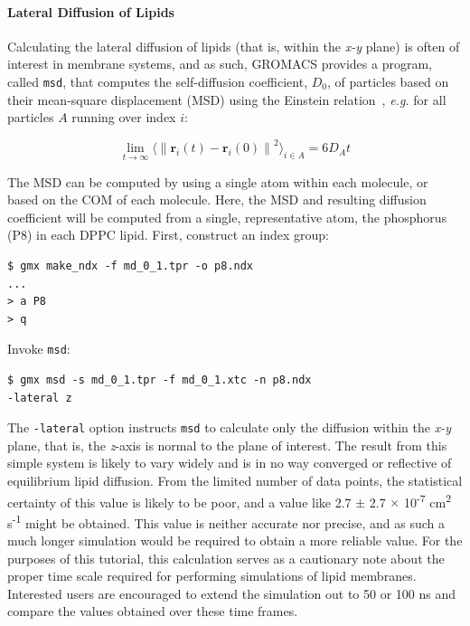 \documentclass[9pt,tutorial]{livecoms}
\newcommand{\norm}[1]{\left\lVert#1\right\rVert}
\begin{document}
\paragraph{Lateral Diffusion of Lipids} \label{kalp_ana_msd}

Calculating the lateral diffusion of lipids (that is, within the {\em x-y} plane) is often of interest in membrane systems, and as such, GROMACS provides a program, called \texttt{msd}, that computes the self-diffusion coefficient, $D_0$, of particles based on their mean-square displacement (MSD) using the Einstein relation~\cite{Allen1987}, {\em e.g.} for all particles $A$ running over index $i$: 

\begin{equation} \label{eq_msd}
\lim_{t\to\infty} \langle \norm{\mathbf{r}_i(t) - \mathbf{r}_i(0)}^2 \rangle_{i \in A} = 6D_{A}t
\end{equation}

The MSD can be computed by using a single atom within each molecule, or based on the COM of each molecule. Here, the MSD and resulting diffusion coefficient will be computed from a single, representative atom, the phosphorus (P8) in each DPPC lipid. First, construct an index group:

\begin{verbatim}
$ gmx make_ndx -f md_0_1.tpr -o p8.ndx
...
> a P8
> q
\end{verbatim}

Invoke \texttt{msd}:

\begin{verbatim}
$ gmx msd -s md_0_1.tpr -f md_0_1.xtc -n p8.ndx
-lateral z
\end{verbatim}

The \texttt{-lateral} option instructs \texttt{msd} to calculate only the diffusion within the {\em x-y} plane, that is, the {\em z}-axis is normal to the plane of interest. The result from this simple system is likely to vary widely and is in no way converged or reflective of equilibrium lipid diffusion. From the limited number of data points, the statistical certainty of this value is likely to be poor, and a value like 2.7 $\pm$ 2.7 $\times$ 10\textsuperscript{-7} cm\textsuperscript{2} s\textsuperscript{-1} might be obtained. This value is neither accurate nor precise, and as such a much longer simulation would be required to obtain a more reliable value. For the purposes of this tutorial, this calculation serves as a cautionary note about the proper time scale required for performing simulations of lipid membranes. Interested users are encouraged to extend the simulation out to 50 or 100 ns and compare the values obtained over these time frames.
\end{document}
